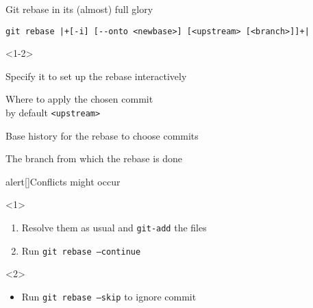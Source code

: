 \documentclass[usenames,svgnames,14pt]{beamer}
\newcommand{\then}{\raisebox{2pt}{$\;\drsh\;$}}
\begin{document}
\begin{frame}[fragile]{Git rebase in its (almost) full glory}
    \begin{lstlisting}[style=MyBash, xleftmargin=5mm, xrightmargin=5mm, aboveskip=-6mm]
        git rebase |+[-i] [--onto <newbase>] [<upstream> [<branch>]]+|
    \end{lstlisting}
    \begin{overlayarea}{\textwidth}{0.5\textheight}
        \begin{onlyenv}<1-2>
            \vspace{2mm}
            \begin{description}
                \item[-i] Specify it to set up the rebase interactively
                \item[<newbase>] Where to apply the chosen commit\\ \then by default \texttt{<upstream>}
                \item[<upstream>] Base history for the rebase to choose commits
                \item[<branch>] The branch from which the rebase is done
            \end{description}
            \begin{varblock*}{alert}[\textwidth]{Conflicts might occur}
                \begin{overlayarea}{\textwidth}{0.12\textheight}
                    \vspace{-4.5mm}
                    \begin{onlyenv}<1>
                        \begin{enumerate}
                            \item Resolve them as usual and \;\texttt{git-add}\; the files
                            \item Run \;\texttt{git rebase --continue}
                        \end{enumerate}
                    \end{onlyenv}
                    \begin{onlyenv}<2>
                        \vspace{-3pt}
                        \begin{itemize}
                            \item Run \;\texttt{git rebase --skip} to ignore commit

\end{itemize}
\end{onlyenv}
\end{overlayarea}
\end{varblock*}
\end{onlyenv}
\end{overlayarea}
\end{frame}
\end{document}
